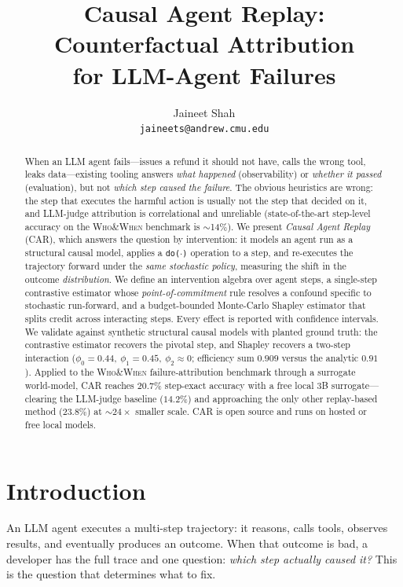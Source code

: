 \documentclass[11pt]{article}
\title{\textbf{Causal Agent Replay: Counterfactual Attribution\\ for LLM-Agent Failures}}
\author{Jaineet Shah\\ \texttt{jaineets@andrew.cmu.edu}}
\date{}
\begin{document}
\maketitle

\begin{abstract}
When an LLM agent fails---issues a refund it should not have, calls the wrong tool, leaks
data---existing tooling answers \emph{what happened} (observability) or \emph{whether it passed}
(evaluation), but not \emph{which step caused the failure}. The obvious heuristics are wrong: the
step that executes the harmful action is usually not the step that decided on it, and LLM-judge
attribution is correlational and unreliable (state-of-the-art step-level accuracy on the
\textsc{Who\&When} benchmark is $\sim$14\%). We present \emph{Causal Agent Replay} (CAR), which
answers the question by intervention: it models an agent run as a structural causal model, applies
a \texttt{do($\cdot$)} operation to a step, and re-executes the trajectory forward under the
\emph{same stochastic policy}, measuring the shift in the outcome \emph{distribution}. We define an
intervention algebra over agent steps, a single-step contrastive estimator whose
\emph{point-of-commitment} rule resolves a confound specific to stochastic run-forward, and a
budget-bounded Monte-Carlo Shapley estimator that splits credit across interacting steps. Every
effect is reported with confidence intervals. We validate against synthetic structural causal
models with planted ground truth: the contrastive estimator recovers the pivotal step, and Shapley
recovers a two-step interaction ($\phi_0{=}0.44,\ \phi_1{=}0.45,\ \phi_2{\approx}0$; efficiency
sum $0.909$ versus the analytic $0.91$). Applied to the \textsc{Who\&When} failure-attribution
benchmark through a surrogate world-model, CAR reaches $20.7\%$ step-exact accuracy with a free
local $3$B surrogate---clearing the LLM-judge baseline ($14.2\%$) and approaching the only other
replay-based method ($23.8\%$) at $\sim\!24\times$ smaller scale. CAR is open source and runs on
hosted or free local models.
\end{abstract}

\section{Introduction}

An LLM agent executes a multi-step trajectory: it reasons, calls tools, observes results, and
eventually produces an outcome. When that outcome is bad, a developer has the full trace and one
question: \emph{which step actually caused it?} This is the question that determines what to fix.
\end{document}
